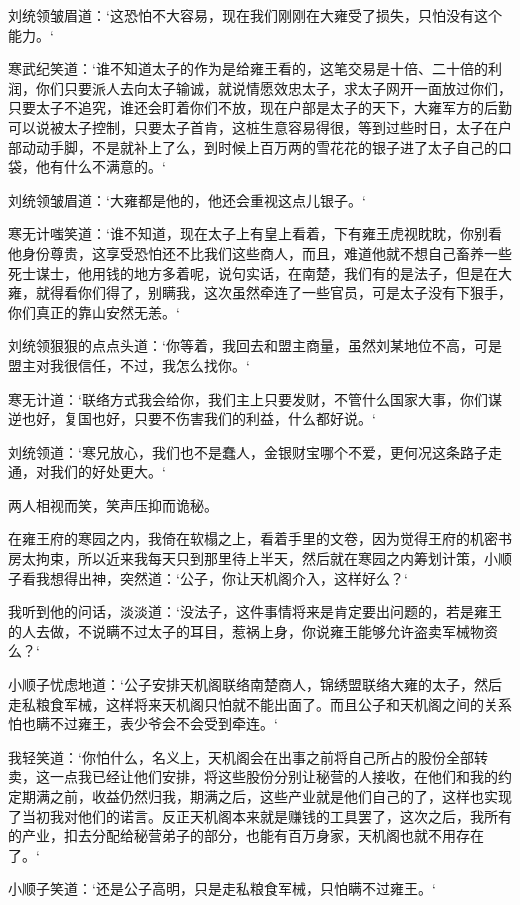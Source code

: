 刘统领皱眉道：‘这恐怕不大容易，现在我们刚刚在大雍受了损失，只怕没有这个能力。‘

寒武纪笑道：‘谁不知道太子的作为是给雍王看的，这笔交易是十倍、二十倍的利润，你们只要派人去向太子输诚，就说情愿效忠太子，求太子网开一面放过你们，只要太子不追究，谁还会盯着你们不放，现在户部是太子的天下，大雍军方的后勤可以说被太子控制，只要太子首肯，这桩生意容易得很，等到过些时日，太子在户部动动手脚，不是就补上了么，到时候上百万两的雪花花的银子进了太子自己的口袋，他有什么不满意的。‘

刘统领皱眉道：‘大雍都是他的，他还会重视这点儿银子。‘

寒无计嗤笑道：‘谁不知道，现在太子上有皇上看着，下有雍王虎视眈眈，你别看他身份尊贵，这享受恐怕还不比我们这些商人，而且，难道他就不想自己畜养一些死士谋士，他用钱的地方多着呢，说句实话，在南楚，我们有的是法子，但是在大雍，就得看你们得了，别瞒我，这次虽然牵连了一些官员，可是太子没有下狠手，你们真正的靠山安然无恙。‘

刘统领狠狠的点点头道：‘你等着，我回去和盟主商量，虽然刘某地位不高，可是盟主对我很信任，不过，我怎么找你。‘

寒无计道：‘联络方式我会给你，我们主上只要发财，不管什么国家大事，你们谋逆也好，复国也好，只要不伤害我们的利益，什么都好说。‘

刘统领道：‘寒兄放心，我们也不是蠢人，金银财宝哪个不爱，更何况这条路子走通，对我们的好处更大。‘

两人相视而笑，笑声压抑而诡秘。

在雍王府的寒园之内，我倚在软榻之上，看着手里的文卷，因为觉得王府的机密书房太拘束，所以近来我每天只到那里待上半天，然后就在寒园之内筹划计策，小顺子看我想得出神，突然道：‘公子，你让天机阁介入，这样好么？‘

我听到他的问话，淡淡道：‘没法子，这件事情将来是肯定要出问题的，若是雍王的人去做，不说瞒不过太子的耳目，惹祸上身，你说雍王能够允许盗卖军械物资么？‘

小顺子忧虑地道：‘公子安排天机阁联络南楚商人，锦绣盟联络大雍的太子，然后走私粮食军械，这样将来天机阁只怕就不能出面了。而且公子和天机阁之间的关系怕也瞒不过雍王，表少爷会不会受到牵连。‘

我轻笑道：‘你怕什么，名义上，天机阁会在出事之前将自己所占的股份全部转卖，这一点我已经让他们安排，将这些股份分别让秘营的人接收，在他们和我的约定期满之前，收益仍然归我，期满之后，这些产业就是他们自己的了，这样也实现了当初我对他们的诺言。反正天机阁本来就是赚钱的工具罢了，这次之后，我所有的产业，扣去分配给秘营弟子的部分，也能有百万身家，天机阁也就不用存在了。‘

小顺子笑道：‘还是公子高明，只是走私粮食军械，只怕瞒不过雍王。‘

